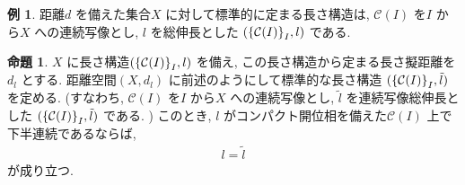 \documentclass[10pt, fleqn, label-section=none]{bxjsarticle}
\theoremstyle{definition}
\newtheorem{ex}[dfn]{例}
\newtheorem{prop}[dfn]{命題}
\newcommand{\cbra}[1]{\mleft\{#1\mright\}}
\renewcommand{\;}{\, ; \,}
\begin{document}
\begin{ex} 距離$d$ を備えた集合$X$ に対して標準的に定まる長さ構造は, $\mathcal C(I)$ を$I$ から$X$ への連続写像とし, $l$ を総伸長とした $(\cbra{ \mathcal C(I)}_I, l)$ である. 
\end{ex}

\begin{prop} $X$ に長さ構造$(\cbra{ \mathcal C(I)}_I, l)$ を備え, この長さ構造から定まる長さ擬距離を$d_l$ とする. 距離空間$(X, d_l)$ に前述のようにして標準的な長さ構造 $(\cbra{ \mathcal C(I)}_I, \tilde l)$ を定める. (すなわち, $\mathcal C(I)$ を$I$ から$X$ への連続写像とし, $\tilde l$ を連続写像総伸長とした $(\cbra{ \mathcal C(I)}_I, \tilde l)$ である. ) このとき, $l$ がコンパクト開位相を備えた$\mathcal C (I)$ 上で下半連続であるならば, 
\begin{align*} l = \tilde l \end{align*}
が成り立つ. 

\end{prop}
\end{document}
